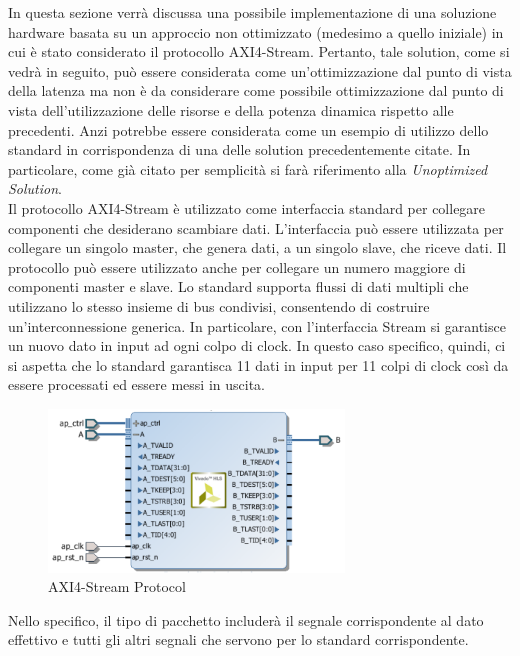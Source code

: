 In questa sezione verrà discussa una possibile implementazione di una soluzione hardware basata su un approccio non ottimizzato (medesimo a quello iniziale) in cui è stato considerato il protocollo AXI4-Stream. Pertanto, tale solution, come si vedrà in seguito, può essere considerata come un'ottimizzazione dal punto di vista della latenza ma non è da considerare come possibile ottimizzazione dal punto di vista dell'utilizzazione delle risorse e della potenza dinamica rispetto alle precedenti. Anzi potrebbe essere considerata come un esempio di utilizzo dello standard in corrispondenza di una delle solution precedentemente citate. In particolare, come già citato per semplicità si farà riferimento alla \textit{Unoptimized Solution}.
\\
Il protocollo AXI4-Stream è utilizzato come interfaccia standard per collegare componenti che desiderano scambiare dati. L'interfaccia può essere utilizzata per collegare un singolo master, che genera dati, a un singolo slave, che riceve dati. Il protocollo può essere utilizzato anche per collegare un numero maggiore di componenti master e slave. Lo standard supporta flussi di dati multipli che utilizzano lo stesso insieme di bus condivisi, consentendo di costruire un'interconnessione generica. In particolare, con l'interfaccia Stream si garantisce un nuovo dato in input ad ogni colpo di clock. In questo caso specifico, quindi, ci si aspetta che lo standard garantisca 11 dati in input per 11 colpi di clock così da essere processati ed essere messi in uscita.

\begin{figure}[H]
	\centering
	\includegraphics[width=0.7\textwidth]{solutions/axi/axistream.png}
	\caption{AXI4-Stream Protocol}
\end{figure}

Nello specifico, il tipo di pacchetto includerà il segnale corrispondente al dato effettivo e tutti gli altri segnali che servono per lo standard corrispondente.



